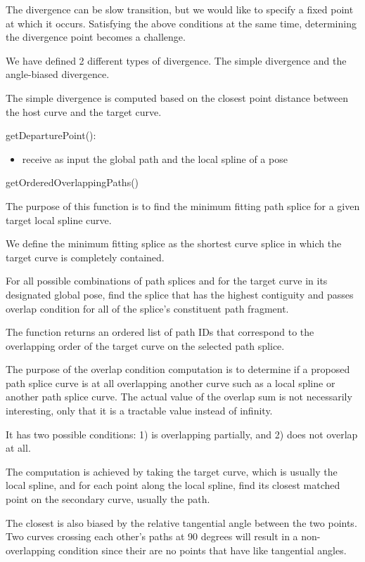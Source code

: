 The divergence can be slow transition, but we would like to specify a fixed point at which it occurs. Satisfying the above conditions at the same time, determining the divergence point becomes a challenge.

We have defined 2 different types of divergence. The simple divergence and the angle-biased divergence.

The simple divergence is computed based on the closest point distance between the host curve and the target curve.

getDeparturePoint():

\begin{itemize}
\item receive as input the global path and the local spline of a pose

\end{itemize}

getOrderedOverlappingPaths()

The purpose of this function is to find the minimum fitting path splice for a given target local spline curve. 

We define the minimum fitting splice as the shortest curve splice in which the target curve is completely contained. 

For all possible combinations of path splices and for the target curve in its designated global pose, find the splice that has the highest contiguity and passes overlap condition for all of the splice's constituent path fragment.

The function returns an ordered list of path IDs that correspond to the overlapping order of the target curve on the selected path splice.

The purpose of the overlap condition computation is to determine if a proposed path splice curve is at all overlapping another curve such as a local spline or another path splice curve. The actual value of the overlap sum is not necessarily interesting, only that it is a tractable value instead of infinity.

It has two possible conditions: 1) is overlapping partially, and 2) does not overlap at all.

The computation is achieved by taking the target curve, which is usually the local spline, and for each point along the local spline, find its closest matched point on the secondary curve, usually the path.

The closest is also biased by the relative tangential angle between the two points. Two curves crossing each other's paths at 90 degrees will result in a non-overlapping condition since their are no points that have like tangential angles.


